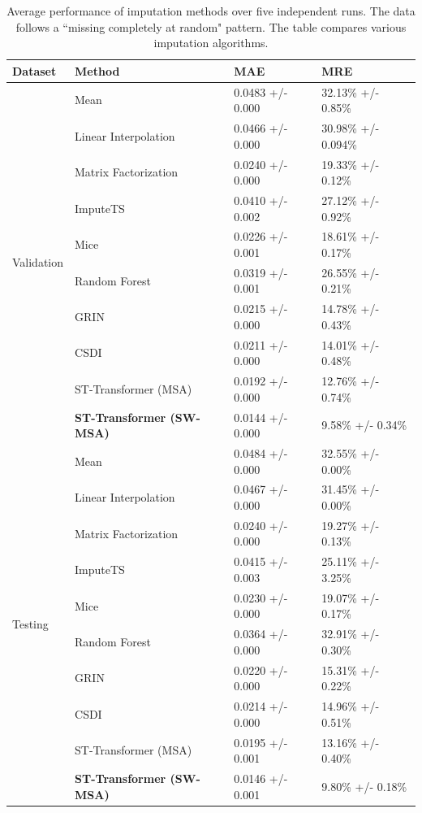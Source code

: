 \documentclass[review]{elsarticle}
\begin{document}
\begin{table}[h!]
    \centering
    \begin{tabularx}{\textwidth}{lXXX}
        \toprule
        Dataset & Method & MAE & MRE \\
        \midrule
         \multirow{10}{*}{Validation}&Mean & 0.0483 +/- 0.000& 32.13\% +/- 0.85\%  \\
        &Linear Interpolation & 0.0466 +/- 0.000 & 30.98\% +/- 0.094\%\\
        &Matrix Factorization & 0.0240 +/- 0.000 & 19.33\% +/- 0.12\% \\
        &ImputeTS & 0.0410 +/- 0.002 & 27.12\% +/- 0.92\% \\
        &Mice & 0.0226 +/- 0.001& 18.61\% +/- 0.17\% \\
        &Random Forest &  0.0319 +/- 0.001&  26.55\% +/- 0.21\%\\
   		&GRIN &0.0215 +/- 0.000 & 14.78\% +/- 0.43\%\\
        &CSDI & 0.0211 +/- 0.000 & 14.01\% +/- 0.48\%\\
        &ST-Transformer (MSA) & 0.0192 +/- 0.000 & 12.76\% +/- 0.74\%\\
        &\textbf{ST-Transformer (SW-MSA)} & 0.0144 +/- 0.000 & 9.58\% +/- 0.34\%\\
        
        \midrule
        \multirow{10}{*}{Testing}&Mean & 0.0484 +/- 0.000 & 32.55\% +/- 0.00\%  \\
        &Linear Interpolation & 0.0467 +/- 0.000& 31.45\% +/- 0.00\%\\
        &Matrix Factorization & 0.0240 +/- 0.000& 19.27\% +/- 0.13\% \\
        &ImputeTS & 0.0415 +/- 0.003 & 25.11\% +/- 3.25\% \\
        &Mice & 0.0230 +/- 0.000& 19.07\% +/- 0.17\% \\
        &Random Forest &  0.0364 +/- 0.000&  32.91\% +/- 0.30\%\\
        &GRIN &0.0220 +/- 0.000 & 15.31\% +/- 0.22\%\\
        &CSDI & 0.0214 +/- 0.000 & 14.96\% +/- 0.51\%\\
        &ST-Transformer (MSA) & 0.0195 +/- 0.001 & 13.16\% +/- 0.40\%\\

        &\textbf{ST-Transformer (SW-MSA)} & 0.0146 +/- 0.001 & 9.80\% +/- 0.18\%\\
        
        \bottomrule

        
    \end{tabularx}
    
    \caption{Average performance of imputation methods over five independent runs. The data follows a ``missing completely at random" pattern. The table compares various imputation algorithms.}
    \label{tab: missing at random}
\end{table}
\end{document}
